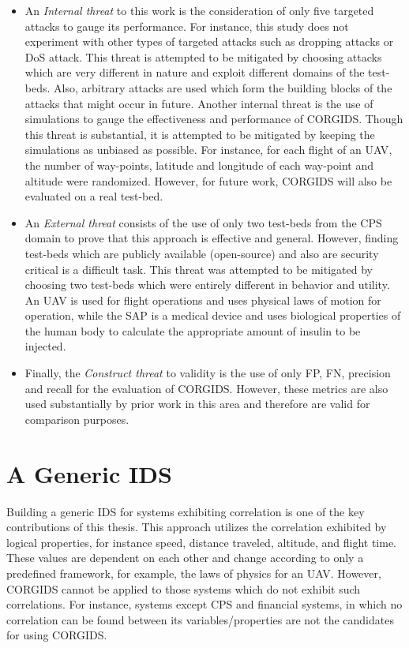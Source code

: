 \begin{itemize}
\item An \textit{Internal threat} to this work is the consideration of only five targeted attacks to gauge its performance. For instance, this study does not experiment with other types of targeted attacks such as dropping attacks or \ac{DoS} attack. This threat is attempted to be mitigated by choosing attacks which are very different in nature and exploit different domains of the test-beds. Also, arbitrary attacks are used which form the building blocks of the attacks that might occur in future. Another internal threat is the use of simulations to gauge the effectiveness and performance of \ac{CORGIDS}. Though this threat is substantial, it is attempted to be mitigated by keeping the simulations as unbiased as possible. For instance, for each flight of an \ac{UAV}, the number of way-points, latitude and longitude of each way-point and altitude were randomized. However, for future work, \ac{CORGIDS} will also be evaluated on a real test-bed. 

\item An \textit{External threat} consists of the use of only two test-beds from the \ac{CPS} domain to prove that this approach is effective and general. However, finding test-beds which are publicly available (open-source) and also are security critical is a difficult task. This threat was attempted to be mitigated by choosing two test-beds which were entirely different in behavior and utility. An \ac{UAV} is used for flight operations and uses physical laws of motion for operation, while the SAP is a medical device and uses biological properties of the human body to calculate the appropriate amount of insulin to be injected. 

\item Finally, the \textit{Construct  threat} to validity is the use of only \ac{FP}, \ac{FN}, precision and recall for the evaluation of \ac{CORGIDS}. However, these metrics are also used substantially by prior work in this area and therefore are valid for comparison purposes. 
\end{itemize}

\section{A Generic IDS}
Building a generic \ac{IDS} for systems exhibiting correlation is one of the key contributions of this thesis. This approach utilizes the correlation exhibited by logical properties, for instance speed, distance traveled, altitude, and flight time. These values are dependent on each other and change according to only a predefined framework, for example, the laws of physics for an \ac{UAV}. However, \ac{CORGIDS} cannot be applied to those systems which do not exhibit such correlations. For instance, systems except \ac{CPS} and financial systems, in which no correlation can be found between its variables/properties are not the candidates for using \ac{CORGIDS}.

